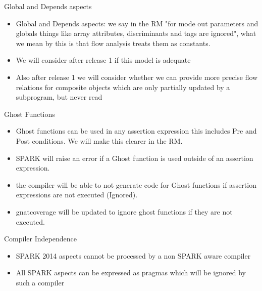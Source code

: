 \documentclass{beamer}
\begin{document}
\begin{frame}{Global and Depends aspects}

  \begin{itemize}

  \item Global and Depends aspects: we say in the RM "for mode out
    parameters and globals things like array attributes,
    discriminants and tags are ignored", what we mean by this is
    that flow analysis treats them as constants.
  \item We will consider after release 1 if this model is adequate
  \item Also after release 1 we will consider whether we can provide more
  precise flow relations for composite objects which are only
  partially updated by a subprogram, but never read
  \end{itemize}

\end{frame}

\begin{frame}{Ghost Functions}

  \begin{itemize}

  \item Ghost functions can be used in any assertion expression this
    includes Pre and Post conditions.  We will make this clearer in the
    RM.
  \item SPARK will raise an error if a Ghost
    function is used outside of an assertion expression.  
  \item the compiler will be able to not generate
    code for Ghost functions if assertion expressions are not executed
    (Ignored).
  \item gnatcoverage will be updated to ignore ghost functions if
    they are not executed.
 \end{itemize}

\end{frame}

\begin{frame}{Compiler Independence}

  \begin{itemize}

  \item SPARK 2014 aspects cannot be processed by a non SPARK aware compiler  
  \item All SPARK aspects can be expressed as pragmas which will be
    ignored by such a compiler
 \end{itemize}

\end{frame}
\end{document}
